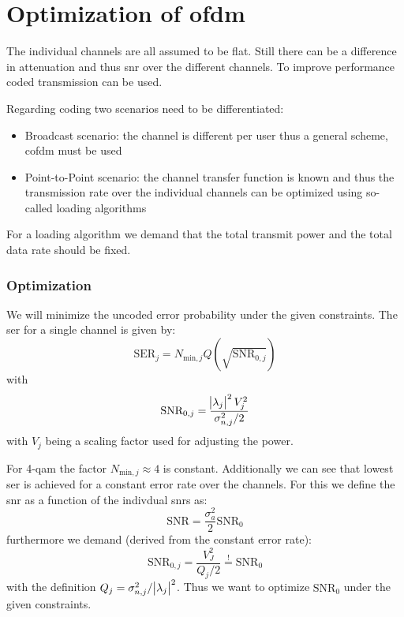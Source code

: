\section{Optimization of \acl{ofdm}}
The individual channels are all assumed to be flat. Still there can be a difference in
attenuation and thus \ac{snr} over the different channels. To improve performance
coded transmission can be used.

Regarding coding two scenarios need to be differentiated:
\begin{itemize}
    \item Broadcast scenario: the channel is different per user thus a general scheme,
        \ac{cofdm} must be used
    \item Point-to-Point scenario: the channel transfer function is known and thus the
        transmission rate over the individual channels can be optimized using so-called
        loading algorithms 
\end{itemize}

For a loading algorithm we demand that the total transmit power and the total data
rate should be fixed.

\subsubsection{Optimization}
We will minimize the uncoded error probability under the given constraints. The
\ac{ser} for a single channel is given by:
\begin{equation}
    \text{SER}_j = N_{\text{min},j} Q\left(\sqrt{\text{SNR}_{0,j}}\right)
\end{equation}
with
\begin{equation}
    \text{SNR}_{0,j} = \frac{\abs{\lambda_j}^2 V_j^2}
        {\sigma_{n,j}^2 / 2}
\end{equation}
with $V_j$ being a scaling factor used for adjusting the power.


For 4-\ac{qam} the factor $N_{\text{min},j} \approx 4$ is constant. Additionally we can
see that lowest \ac{ser} is achieved for a constant error rate over the channels.
For this we define the \ac{snr} as a function of the indivdual \ac{snr}s as:
\begin{equation}
    \text{SNR} = \frac{\sigma_a^2}{2} \text{SNR}_0
\end{equation}
furthermore we demand (derived from the constant error rate):
\begin{equation}
    \text{SNR}_{0,j} = \frac{V_J^2}{Q_j/2} \stackrel{!}{=} \text{SNR}_0
\end{equation}
with the definition $Q_j = \sigma_{n,j}^2 / \abs{\lambda_j}^2$. Thus we want to optimize
$\text{SNR}_0$ under the given constraints.

